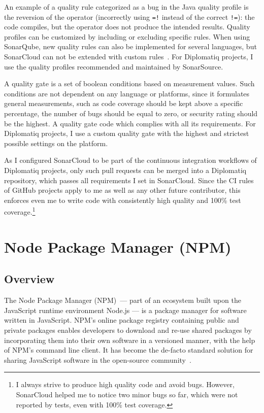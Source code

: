 An example of a quality rule categorized as a bug in the Java quality profile is the reversion of the  operator (incorrectly using \lstinline{=!} instead of the correct \lstinline{!=}): the code compiles, but the operator does not produce the intended results. Quality profiles can be customized by including or excluding specific rules. When using SonarQube, new quality rules can also be implemented for several languages, but SonarCloud can not be extended with custom rules~\cite{sonar-custom-rules}. For Diplomatiq projects, I use the quality profiles recommended and maintained by SonarSource.

A quality gate is a set of boolean conditions based on measurement values. Such conditions are not dependent on any language or platforms, since it formulates general measurements, such as code coverage should be kept above a specific percentage, the number of bugs should be equal to zero, or security rating should be the highest. A quality gate  code which complies with all its requirements. For Diplomatiq projects, I use a custom quality gate with the highest and strictest possible settings on the platform.

As I configured SonarCloud to be part of the continuous integration workflows of Diplomatiq projects, only such pull requests can be merged into a Diplomatiq repository, which passes all requirements I set in SonarCloud. Since the CI rules of GitHub projects apply to me as well as any other future contributor, this enforces even me to write code with consistently high quality and 100\% test coverage.\footnote{I always strive to produce high quality code and avoid bugs. However, SonarCloud helped me to notice two minor bugs so far, which were not reported by tests, even with 100\% test coverage.}

\section{Node Package Manager (NPM)}

\subsection{Overview}

The Node Package Manager (NPM) — part of an ecosystem built upon the JavaScript runtime environment Node.js — is a package manager for software written in JavaScript. NPM's online package registry containing public and private packages enables developers to download and re-use shared packages by incorporating them into their own software in a versioned manner, with the help of NPM's command line client. It has become the de-facto standard solution for sharing JavaScript software in the open-source community~\cite{herron2016node}.

